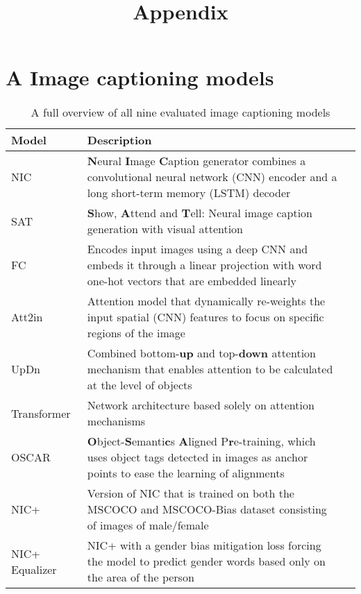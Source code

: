 \newpage

\title{\textbf{Appendix}}
\newline

\chapter{\textbf{A \quad Image captioning models}}

\begin{table}[H]
    \centering
    \renewcommand{\arraystretch}{1.5} %
    \setlength{\tabcolsep}{6.25pt} %
    \begin{tabular}{p{0.65in}p{3.1in}p{1.5in}}
    \toprule
        Model & Description \\
        \hline
        NIC \cite{NIC:2015} & \textbf{N}eural \textbf{I}mage \textbf{C}aption generator combines a convolutional neural network (CNN) encoder and a long short-term memory (LSTM) decoder \\
        
        SAT \cite{SAT:2015} & \textbf{S}how, \textbf{A}ttend and \textbf{T}ell: Neural image caption generation with visual attention\\
        
        FC \cite{Att2inFC:2016} &  Encodes input images using a deep CNN and embeds it through a linear projection with word one-hot vectors that are embedded linearly \\
        
        Att2in \cite{Att2inFC:2016} & Attention model that dynamically re-weights the input spatial (CNN) features to focus on specific regions of the image \\
        
        UpDn \cite{UpDn:2017} & Combined bottom-\textbf{up} and top-\textbf{down} attention mechanism that enables attention to be calculated at the level of objects \\
        
        Transformer \cite{transformer:2017} & Network architecture based solely on attention mechanisms \\
        
        OSCAR \cite{OSCAR:2020} & \textbf{O}bject-\textbf{S}emanti\textbf{c}s \textbf{A}ligned P\textbf{r}e-training, which uses object tags detected in images as anchor points to ease the learning of alignments \\
        
        NIC+ \cite{NICplusNICEqualizer:2018} & Version of NIC that is trained on both the MSCOCO and MSCOCO-Bias dataset consisting of images of male/female \\
        
        NIC+ Equalizer \cite{NICplusNICEqualizer:2018} & NIC+ with a gender bias mitigation loss forcing the model to predict gender words based only on the area of the person \\
        
    \bottomrule 
    \end{tabular}
    \caption{A full overview of all nine evaluated image captioning models}
    \label{table:overview-caption-models}
\end{table}

